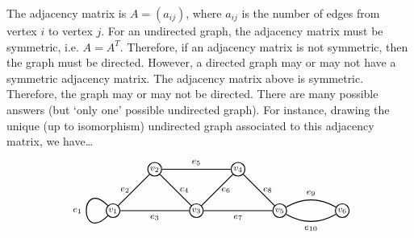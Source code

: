 \documentclass[11pt,letterpaper]{article}
\begin{document}
\sol The adjacency matrix is $A= (a_{ij})$, where $a_{ij}$ is the number of edges from vertex $i$ to vertex $j$. For an undirected graph, the adjacency matrix must be symmetric, i.e. $A= A^T$. Therefore, if an adjacency matrix is not symmetric, then the graph must be directed. However, a directed graph may or may not have a symmetric adjacency matrix. The adjacency matrix above is symmetric. Therefore, the graph may or may not be directed. There are many possible answers (but `only one' possible undirected graph). For instance, drawing the unique (up to isomorphism) undirected graph associated to this adjacency matrix, we have\dots
	\[
	\begin{tikzpicture}[scale=1.3]
	\node[draw,inner sep=1pt,minimum size=2pt,line width=0.03cm,circle] at (0, 0)   (a) {\footnotesize$v_1$};
	\node[draw,inner sep=1pt,minimum size=2pt,line width=0.03cm,circle] at (1, 1)   (b) {\footnotesize$v_2$};
	\node[draw,inner sep=1pt,minimum size=2pt,line width=0.03cm,circle] at (2, 0)   (c) {\footnotesize$v_3$};
	\node[draw,inner sep=1pt,minimum size=2pt,line width=0.03cm,circle] at (3, 1)   (d) {\footnotesize$v_4$};
	\node[draw,inner sep=1pt,minimum size=2pt,line width=0.03cm,circle] at (4, 0)   (e) {\footnotesize$v_5$};
	\node[draw,inner sep=1pt,minimum size=2pt,line width=0.03cm,circle] at (5.5, 0)   (f) {\footnotesize$v_6$};

	\path[line width=0.03cm,out=135,in=225,looseness=10] (a) edge node[left] {\footnotesize$e_1$} (a);
	\path[line width=0.03cm] (a) edge node[left] {\footnotesize$e_2$} (b);
	\path[line width=0.03cm] (a) edge node[below] {\footnotesize$e_3$} (c);
	\path[line width=0.03cm] (b) edge node[right] {\footnotesize$e_4$} (c);
	\path[line width=0.03cm] (b) edge node[above] {\footnotesize$e_5$} (d);
	\path[line width=0.03cm] (c) edge node[right] {\footnotesize$e_6$} (d);
	\path[line width=0.03cm] (c) edge node[below] {\footnotesize$e_7$} (e);
	\path[line width=0.03cm] (d) edge node[right] {\footnotesize$e_8$} (e);
	\path[line width=0.03cm, bend left=30] (e) edge node[above] {\footnotesize$e_9$} (f);
	\path[line width=0.03cm, bend right=30] (e) edge node[below] {\footnotesize$e_{10}$} (f);
	\end{tikzpicture}
	\]
\end{document}
